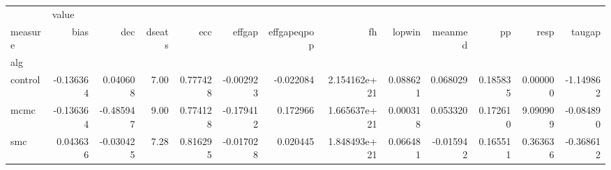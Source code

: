 \begin{tabular}{lrrrrrrrrrrrr}
\toprule
{} & \multicolumn{12}{l}{value} \\
measure &      bias &       dec & dseats &       ecc &    effgap & effgapeqpop &            fh &    lopwin &   meanmed &        pp &      resp &    taugap \\
alg     &           &           &        &           &           &             &               &           &           &           &           &           \\
\midrule
control & -0.136364 &  0.040608 &   7.00 &  0.777428 & -0.002923 &   -0.022084 &  2.154162e+21 &  0.088621 &  0.068029 &  0.185835 &  0.000000 & -1.149862 \\
mcmc    & -0.136364 & -0.485947 &   9.00 &  0.774128 & -0.179412 &    0.172966 &  1.665637e+21 &  0.000318 &  0.053320 &  0.172610 &  9.090909 & -0.084890 \\
smc     &  0.043636 & -0.030425 &   7.28 &  0.816295 & -0.017028 &    0.020445 &  1.848493e+21 &  0.066481 & -0.015942 &  0.165511 &  0.363636 & -0.368612 \\
\bottomrule
\end{tabular}
